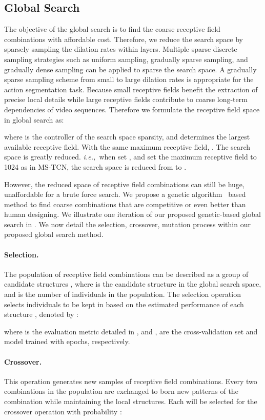 \documentclass[final]{cvpr}
\newcommand{\myPara}[1]{\vspace{-.12in}\paragraph{#1}}
\def\ie{\emph{i.e.,~}}
\begin{document}
\subsection{Global Search} \label{sec:gs}

The objective of the global search is to find the coarse receptive field combinations
with affordable cost.
Therefore, we reduce the search space by sparsely sampling the dilation rates within layers.
Multiple sparse discrete sampling strategies such as uniform sampling, 
gradually sparse sampling, and gradually dense sampling can be applied to sparse the search space.
A gradually sparse sampling scheme from small to large dilation rates is appropriate for the action segmentation task.
Because small receptive fields benefit the extraction of precise local details
while large receptive fields contribute to coarse long-term dependencies of video sequences.
Therefore we formulate the receptive field space in global search as:

where  is the controller of the search space sparsity, and  determines the
largest available receptive field.
With the same maximum receptive field, . The search space is greatly reduced.
\ie when set , and set the maximum receptive field to 1024 as in MS-TCN, 
the search space is reduced from  to .


However, the reduced space of receptive field combinations can still be huge, 
unaffordable for a brute force search.
We propose a genetic algorithm~\cite{mitchell1998introduction} based method 
to find coarse combinations that are competitive or even better 
than human designing.
We illustrate one iteration of our proposed genetic-based global search in
.
We now detail the selection, crossover, mutation process within 
our proposed global search method. 


\myPara{Selection.} 
The population of receptive field combinations can be described as 
a group of candidate structures , 
where  is the candidate structure in the global search space, 
and  is the number of individuals in the population. 
The selection operation selects individuals to be kept in  based on the 
estimated performance of each structure , denoted by :

where  is the evaluation metric detailed in , 
and ,  are 
the cross-validation set and model trained with  epochs, respectively.
\myPara{Crossover.} 
This operation generates new samples of receptive field combinations. 
Every two combinations in the population are exchanged to born new patterns of 
the combination while maintaining the local structures.
Each  will be selected for the crossover operation with probability : 
\end{document}
